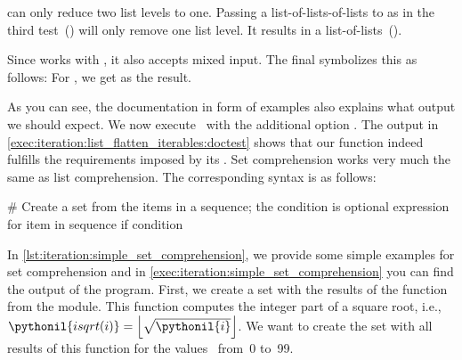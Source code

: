  can only reduce two list levels to one.
Passing a list-of-lists-of-lists to  as in the third test~() will only remove one list level.
It results in a list-of-lists~(\pythonil{[[1], [2], [3], [4], [5], [6]]}).%
%
\begin{sloppypar}%
Since  works with , it also accepts mixed input.
The final  symbolizes this as follows:
For , we get \pythonil{[1, 2, 3, 4, 5, 6, 'a', 'b']} as the result.
\end{sloppypar}%
%
As you can see, the documentation in form of examples also explains what output we should expect.
We now execute \pytest\ with the additional option .
The output in \cref{exec:iteration:list_flatten_iterables:doctest} shows that our function indeed fulfills the requirements imposed by its .%
%
%
%
\FloatBarrier%
\endhsection%
%
%
%
Set comprehension works very much the same as list comprehension.
The corresponding syntax is as follows:%
%
\begin{pythonSyntax}
# Create a set from the items in a sequence; the condition is optional
{expression for item in sequence if condition}
\end{pythonSyntax}
%
%
%
In \cref{lst:iteration:simple_set_comprehension}, we provide some simple examples for set comprehension and in \cref{exec:iteration:simple_set_comprehension} you can find the output of the program.
First, we create a set with the results of the  function from the  module.
This function computes the integer part of a square root, i.e., $\pythonil{isqrt(i)}=\left\lfloor\sqrt{\pythonil{i}}\right\rfloor$.
We want to create the set with all results of this function for the values~ from~0 to~99.
